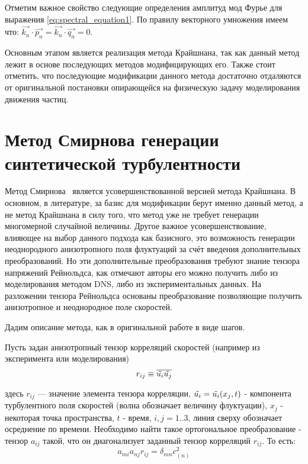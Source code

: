 Отметим важное свойство следующие определения амплитуд мод Фурье для выражения \ref{eq:spectral_equation1}. По правилу векторного умножения имеем что: $\vec{k_n} \cdot \vec{p_n} = \vec{k_n} \cdot \vec{q_n} = 0$. 

Основным этапом является реализация метода Крайшнана, так как данный метод лежит в основе последующих методов модифицирующих его. Также стоит отметить, что последующие модификации данного метода достаточно отдаляются от оригинальной постановки опирающейся на физическую задачу моделирования движения частиц.

\section{Метод Смирнова генерации синтетической турбулентности} \label{sect2_2}
Метод Смирнова~\cite{Smirnov2001} является усовершенствованной версией метода Крайшнана. В основном, в литературе, за базис для модификации берут именно данный метод, а не метод Крайшнана в силу того, что метод уже не требует генерации многомерной случайной величины. Другое важное усовершенствование, влияющее на выбор данного подхода как базисного, это возможность генерации неоднородного анизотропного поля флуктуаций за счёт введения дополнительных преобразований. Но эти дополнительные преобразования требуют знание тензора напряжений Рейнольдса, как отмечают авторы его можно получить либо из моделирования методом DNS, либо из экспериментальных данных. На разложении тензора Рейнольдса основаны преобразование позволяющие получить анизотропное и неоднородное поле скоростей. 


Дадим описание метода, как в оригинальной работе в виде шагов.

Пусть задан анизотропный тензор корреляций скоростей (например из эксперимента или моделирования)
\begin{equation}
  \label{eq:spectral_equation3}
    r_{ij} \equiv \overline{\Tilde{u_i} \Tilde{u_j}}
\end{equation}

здесь $r_{ij}$ — значение элемента тензора корреляции, $\Tilde{u_i} = \Tilde{u_i}(x_j, t)$ - компонента турбулентного поля скоростей (волна обозначает величину флуктуации), $x_j$ - некоторая точка пространства, $t$ - время, $i,j=1..3$, линия сверху обозначает осреднение по времени. 
Необходимо найти такое ортогональное преобразование - тензор $a_{ij}$ такой, что он диагонализует заданный тензор корреляций $r_{ij}$. То есть:
\begin{equation}
  \label{eq:spectral_equation4}
    a_{mi} a_{nj} r_{ij} = \delta_{mn} c^2_(n)
\end{equation}

